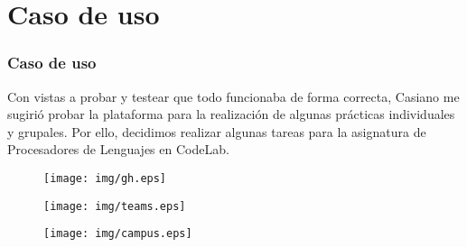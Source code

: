 \documentclass{beamer}
\begin{document}
\section{Caso de uso}

\begin{frame}[allowframebreaks]
\frametitle{Caso de uso}

  Con vistas a probar y testear que todo funcionaba de forma correcta, Casiano me sugirió probar 
  la plataforma para la realización de algunas prácticas individuales y grupales. Por ello, decidimos 
  realizar algunas tareas para la asignatura de Procesadores de Lenguajes en CodeLab.

  \framebreak

  \begin{figure}[!htb]
      \texttt{[image: img/gh.eps]}
  \end{figure}

  \framebreak

  \begin{figure}[!htb]
      \texttt{[image: img/teams.eps]}
  \end{figure}

  \framebreak

  \begin{figure}[!htb]
      \texttt{[image: img/campus.eps]}
  \end{figure}

\end{frame}

\end{document}
